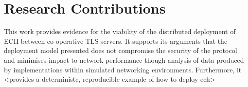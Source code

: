 \section{Research Contributions}

This work provides evidence for the viability of the distributed deployment of ECH between co-operative TLS servers. It supports its arguments that the deployment model presented does not compromise the security of the protocol and minimises impact to network performance though analysis of data produced by implementations within simulated networking environments. Furthermore, it <provides a deterministc, reproducible example of how to deploy ech>
